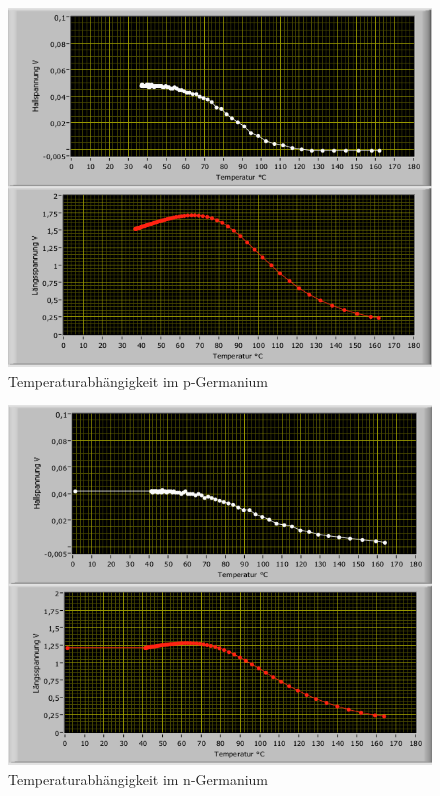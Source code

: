\documentclass[12pt,a4paper]{article}
\begin{document}
\begin{figure}[H]
	\centering
	\includegraphics[scale=0.8]{./figures/Hall_pGe_temp.png}
	\caption{Temperaturabhängigkeit im p-Germanium}
	\label{fig:pGe_mag_temp}
\end{figure}
\begin{figure}[H]
	\centering
	\includegraphics[scale=0.8]{./figures/Hall_nGe_temp.png}
	\caption{Temperaturabhängigkeit im n-Germanium}
	\label{fig:nGe_mag_temp}
\end{figure}
\end{document}
